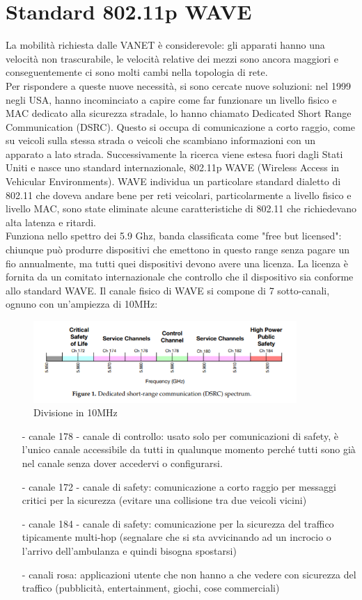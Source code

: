 \documentclass[12pt,italian]{report}
\begin{document}
\section{Standard 802.11p WAVE} 
La mobilità richiesta dalle VANET è considerevole: gli apparati hanno una velocità non trascurabile, le velocità relative dei mezzi sono ancora maggiori e conseguentemente ci sono molti cambi nella topologia di rete. \\
Per rispondere a queste nuove necessità, si sono cercate nuove soluzioni: nel 1999 negli USA,  hanno incominciato a capire come far funzionare un livello fisico e MAC dedicato alla sicurezza stradale, lo hanno chiamato Dedicated Short Range Communication (DSRC). Questo si occupa di comunicazione a corto raggio, come su veicoli sulla stessa strada o veicoli che scambiano informazioni con un apparato a lato strada. Successivamente la ricerca viene estesa fuori dagli Stati Uniti e nasce uno standard internazionale, 802.11p WAVE (Wireless Access in Vehicular Environments). 
\bigbreak
WAVE individua un particolare standard dialetto di 802.11 che doveva andare bene per reti veicolari, particolarmente a livello fisico e livello MAC, sono state eliminate alcune caratteristiche di 802.11 che richiedevano alta latenza e ritardi. \\
Funziona nello spettro dei 5.9 Ghz, banda classificata come "free but licensed": chiunque può produrre dispositivi che emettono in questo range senza pagare un fio annualmente, ma tutti quei dispositivi devono avere una licenza. La licenza è fornita da un comitato internazionale che controllo che il dispositivo sia conforme allo standard WAVE. 
\bigbreak
Il canale fisico di WAVE si compone di 7 sotto-canali, ognuno con un'ampiezza di 10MHz:
\begin{figure}[h]
\centering
\includegraphics[width=100mm]{img/wavespec.PNG}
\caption{Divisione in 10MHz}
\label{fig:ulfrfrwar}
\end{figure}
\begin{itemize}
     \item [-] canale 178 - canale di controllo: usato solo per comunicazioni di safety, è l'unico canale accessibile da tutti in qualunque momento perché tutti sono già nel canale senza dover accedervi o configurarsi.
    \item [-] canale 172 - canale di safety: comunicazione a corto raggio per messaggi critici per la sicurezza (evitare una collisione tra due veicoli vicini)
    \item [-] canale 184 - canale di safety: comunicazione per la sicurezza del traffico tipicamente multi-hop (segnalare che si sta avvicinando ad un incrocio o l'arrivo dell'ambulanza e quindi bisogna spostarsi)
    \item [-] canali rosa: applicazioni utente che non hanno a che vedere con sicurezza del traffico (pubblicità, entertainment, giochi, cose commerciali)
\end{itemize}
\end{document}
